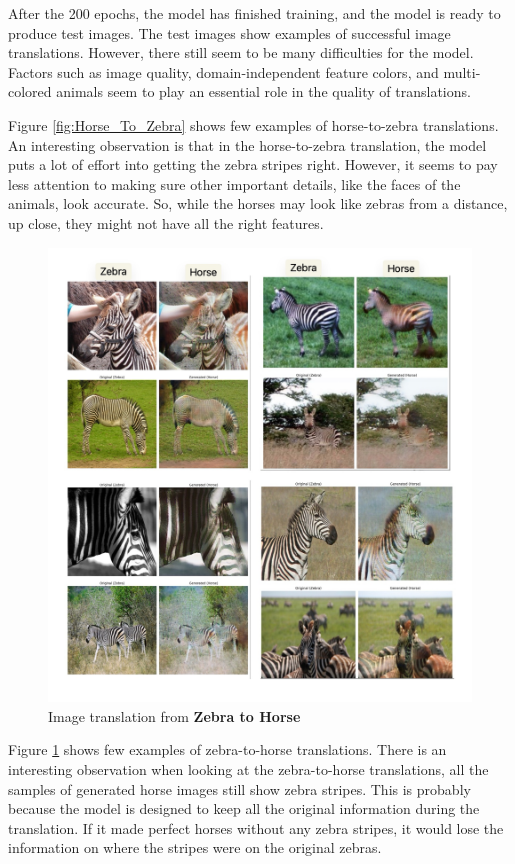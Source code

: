 \documentclass[UKenglish,12pt]{master-style}
\begin{document}
After the 200 epochs, the model has finished training, and the model is ready to produce test images. The test images show examples of successful image translations. However, there still seem to be many difficulties for the model. Factors such as image quality, domain-independent feature colors, and multi-colored animals seem to play an essential role in the quality of translations. 

Figure \ref{fig:Horse_To_Zebra}  shows few examples of horse-to-zebra translations. An interesting observation is that in the horse-to-zebra translation, the model puts a lot of effort into getting the zebra stripes right. However, it seems to pay less attention to making sure other important details, like the faces of the animals, look accurate. So, while the horses may look like zebras from a distance, up close, they might not have all the right features.

\begin{figure}[htbp]
    \centering
    \includegraphics[width=1\textwidth]{Images/Zebra_To_Horse.jpeg}
    \caption{Image translation from \textbf{Zebra to Horse}}
    \label{fig:Zebra_To_Horse}
\end{figure}

Figure \ref{fig:Zebra_To_Horse}  shows few examples of zebra-to-horse translations.  There is an interesting observation when looking at the zebra-to-horse translations, 
all the samples of generated horse images still show zebra stripes. This is probably because the model is designed to keep all the original information during the translation. If it made perfect horses without any zebra stripes, it would lose the information on where the stripes were on the original zebras.
\end{document}
